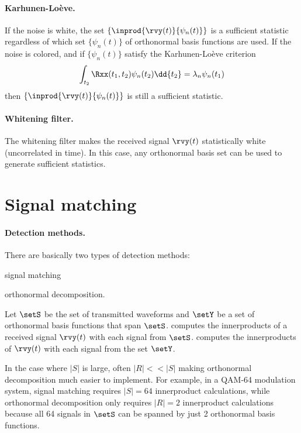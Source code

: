 \paragraph{Karhunen-Lo\`{e}ve.}
If the noise is white, the set $\{\inprod{\rvy(t)}{\psi_n(t)}\}$
is a sufficient statistic regardless of which
set $\{\psi_n(t)\}$ of orthonormal basis functions are used.
If the noise is colored, and if $\{\psi_n(t)\}$ satisfy the
Karhunen-Lo\`{e}ve criterion
   \[ \int_{t_2}\Rxx(t_1,t_2)\psi_n(t_2)\dd{t_2} = \lambda_n \psi_n(t_1) \]
then $\{\inprod{\rvy(t)}{\psi_n(t)}\}$ is still a sufficient statistic.

\paragraph{Whitening filter.}
The whitening filter makes the received signal $\rvy(t)$ statistically white
(uncorrelated in time). In this case,
any orthonormal basis set can be used to generate sufficient statistics.




\section{Signal matching}
\paragraph{Detection methods.}
There are basically two types of detection methods:
\begin{enume}
   \item signal matching
   \item orthonormal decomposition.
\end{enume}

Let $\setS$ be the set of transmitted waveforms and
$\setY$ be a set of orthonormal basis functions that span $\setS$.
 computes the innerproducts of a
received signal $\rvy(t)$ with each signal from $\setS$.
 computes the innerproducts of
$\rvy(t)$ with each signal from the set $\setY$.

In the case where $|S|$ is large, often $|R|<<|S|$
making orthonormal decomposition much easier to implement.
For example, in a QAM-64 modulation system,
signal matching requires $|S|=64$ innerproduct calculations,
while orthonormal decomposition only requires $|R|=2$
innerproduct calculations because all 64 signals in $\setS$ can be spanned
by just 2 orthonormal basis functions.

